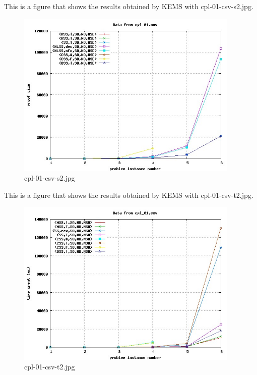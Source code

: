 This is a figure that shows the results obtained by KEMS with cpl-01-csv-s2.jpg.
\begin{figure}[htbp]
\begin{center}
\includegraphics[width=0.95\textwidth]{figuras/cpl-01-csv-s2.jpg}
\end{center}
\caption{cpl-01-csv-s2.jpg}
\end{figure}

This is a figure that shows the results obtained by KEMS with cpl-01-csv-t2.jpg.
\begin{figure}[htbp]
\begin{center}
\includegraphics[width=0.95\textwidth]{figuras/cpl-01-csv-t2.jpg}
\end{center}
\caption{cpl-01-csv-t2.jpg}
\end{figure}

